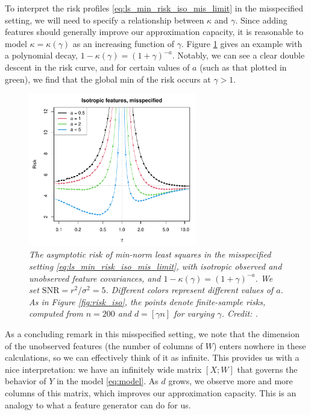 \documentclass{article}
\begin{document}
To interpret the risk profiles \eqref{eq:ls_min_risk_iso_mis_limit} in the
misspecified setting, we will need to specify a relationship between $\kappa$
and $\gamma$. Since adding features should generally improve our approximation
capacity, it is reasonable to model $\kappa=\kappa(\gamma)$ as an increasing 
function of $\gamma$. Figure \ref{fig:risk_iso_mis} gives an example with a
polynomial decay, $1-\kappa(\gamma) = (1+\gamma)^{-a}$. Notably, we can see a
clear double descent in the risk curve, and for certain values of $a$ (such as
that plotted in green), we find that the global min of the risk occurs at
$\gamma > 1$.  

\begin{figure}[htb]
\centering
\includegraphics[width=0.65\textwidth]{risk_iso_mis.pdf}
\caption{\it The asymptotic risk of min-norm least squares in the misspecified
  setting \eqref{eq:ls_min_risk_iso_mis_limit}, with isotropic observed and
  unobserved feature covariances, and $1-\kappa(\gamma) = (1+\gamma)^{-a}$. We
  set $\mathrm{SNR} = r^2 / \sigma^2 = 5$. Different colors represent different
  values of $a$. As in Figure \ref{fig:risk_iso}, the points denote
  finite-sample risks, computed from $n=200$ and $d=[\gamma n]$ for varying 
  $\gamma$. Credit: \citet{hastie2022surprises}.}   
\label{fig:risk_iso_mis}
\end{figure}

As a concluding remark in this misspecified setting, we note that the dimension
of the unobserved features (the number of columns of $W$) enters nowhere in
these calculations, so we can effectively think of it as infinite. This provides
us with a nice interpretation: we have an infinitely wide matrix $[X; W]$ that 
governs the behavior of $Y$ in the model \eqref{eq:model}. As $d$ grows, we
observe more and more columns of this matrix, which improves our approximation
capacity. This is an analogy to what a feature generator can do for us.       
\end{document}
